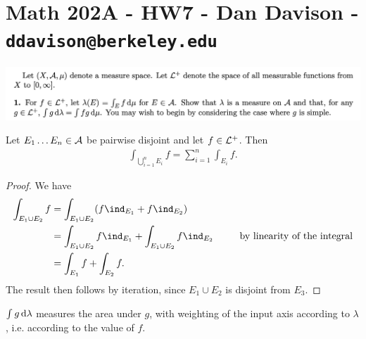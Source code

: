 \section*{Math 202A - HW7 - Dan Davison - \texttt{ddavison@berkeley.edu}}

\begin{mdframed}
\includegraphics[width=400pt]{img/analysis--berkeley-202a-hw07-9f9b.png}
\end{mdframed}

\begin{lemma}\label{lemma-finite-additivity-of-integral}
  Let $E_1 \ldots E_n \in \mathcal A$ be pairwise disjoint and let $f \in \mathcal L^+$. Then
  \begin{align*}
    \int_{\bigcup_{i=1}^n E_i} f = \sum_{i=1}^n \int_{E_i}f.
  \end{align*}
\end{lemma}

\begin{proof}
  We have
  \begin{align*}
    \int_{E_1 \cup E_2} f
    &= \int_{E_1 \cup E_2} (f\ind_{E_1} + f\ind_{E_2}) \\
    &= \int_{E_1 \cup E_2} f\ind_{E_1} + \int_{E_1 \cup E_2} f\ind_{E_2} ~~~~~~~\text{~by linearity of the integral}\\
    &= \int_{E_1} f + \int_{E_2} f.
  \end{align*}
  The result then follows by iteration, since $E_1 \cup E_2$ is disjoint from $E_3$.
\end{proof}

\begin{remark*}
  $\int g \d\lambda$ measures the area under $g$, with weighting of the input axis according to $\lambda$, i.e.
  according to the value of $f$.
\end{remark*}


